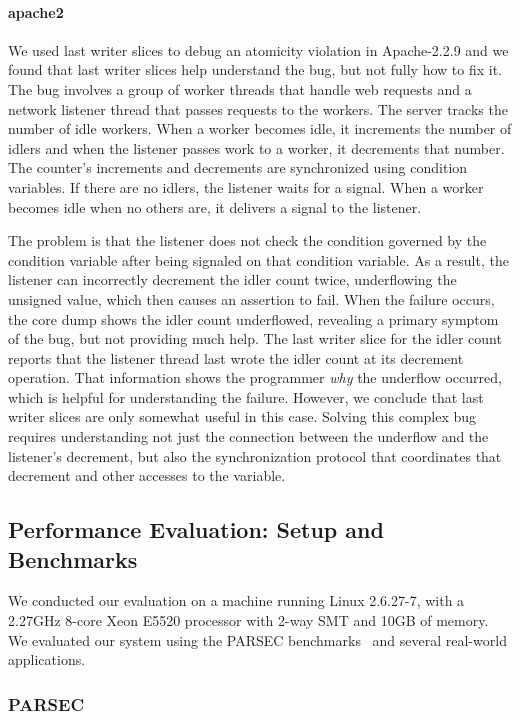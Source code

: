 \documentclass[10pt,nocopyrightspace]{sigplanconf}
\begin{document}
\paragraph{apache2}
We used last writer slices to debug an atomicity violation in Apache-2.2.9 and
we found that last writer slices help understand the bug, but not fully how to fix
it.  The bug involves a group of worker threads that handle web requests and a
network listener thread that passes requests to the workers.  The server tracks
the number of idle workers.  When a worker becomes idle, it increments the
number of idlers and when the listener passes work to a worker, it decrements
that number.  The counter's increments and decrements are synchronized using
condition variables.  If there are no idlers, the listener waits for a signal.
When a worker becomes idle when no others are, it delivers a signal to the
listener.

The problem is that the listener does not check the condition governed by the
condition variable after being signaled on that condition variable.  As a
result, the listener can incorrectly decrement the idler count twice,
underflowing the unsigned value, which then causes an assertion to fail.  When
the failure occurs, the core dump shows the idler count underflowed, revealing
a primary symptom of the bug, but not providing much help.  The last
writer slice for the idler count reports that the listener thread last
wrote the idler count at its decrement operation.  That information shows the programmer
{\em why} the underflow occurred, which is helpful for understanding the
failure.  However, we conclude that last writer slices are only somewhat 
useful in this case.  Solving this complex bug requires understanding not just
the connection between the underflow and the listener's decrement, but also the
synchronization protocol that coordinates that decrement and other accesses to
the variable.  

\subsection{Performance Evaluation: Setup and Benchmarks}

We conducted our evaluation on a machine running Linux 2.6.27-7, with a 2.27GHz
8-core Xeon E5520 processor with 2-way SMT and 10GB of memory.  We evaluated
our system using the PARSEC benchmarks~\cite{parsec} and several 
real-world applications.    

\subsubsection{PARSEC}
\end{document}
